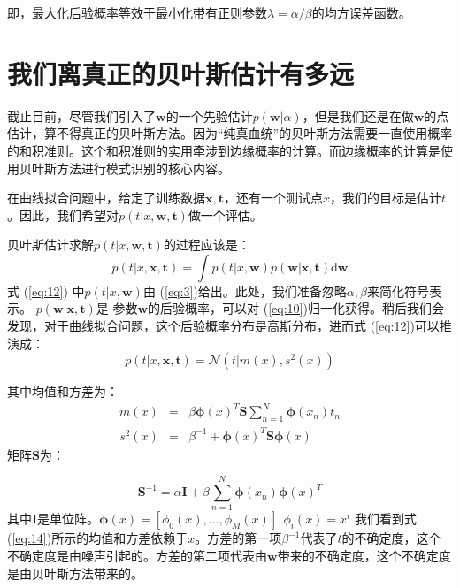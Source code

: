 \documentclass[10pt,a4paper,UTF8]{article}
\begin{document}
即，最大化后验概率等效于最小化带有正则参数\(\lambda = \alpha/\beta\)的均方误差函数。

\section{我们离真正的贝叶斯估计有多远}
\label{sec:org4e00da5}


截止目前，尽管我们引入了\(\mathbf{w}\)的一个先验估计\(p(\mathbf{w}|\alpha)\)，但是我们还是在做\(\mathbf{w}\)的点估计，算不得真正的贝叶斯方法。因为“纯真血统”的贝叶斯方法需要一直使用概率的和积准则。这个和积准则的实用牵涉到边缘概率的计算。而边缘概率的计算是使用贝叶斯方法进行模式识别的核心内容。

在曲线拟合问题中，给定了训练数据\(\mathbf{x}, \mathbf{t}\)，还有一个测试点\(x\)，我们的目标是估计\(t\)。因此，我们希望对\(p(t|x, \mathbf{w}, \mathbf{t})\)做一个评估。

贝叶斯估计求解\(p(t|x, \mathbf{w}, \mathbf{t})\)的过程应该是：
\begin{equation}
\label{eq:12}
p(t| x, \mathbf{x}, \mathbf{t}) = \int p(t | x, \mathbf{w})p( \mathbf{w} | \mathbf{x}, \mathbf{t}) \mathrm{d} \mathbf{w}
\end{equation}
式 (\ref{eq:12}) 中\(p(t| x, \mathbf{w})\)由 (\ref{eq:3})给出。此处，我们准备忽略\(\alpha, \beta\)来简化符号表示。 \(p( \mathbf{w} | \mathbf{x}, \mathbf{t})\)是 参数\(\mathbf{w}\)的后验概率，可以对 (\ref{eq:10})归一化获得。稍后我们会发现，对于曲线拟合问题，这个后验概率分布是高斯分布，进而式 (\ref{eq:12})可以推演成：
\begin{equation}
\label{eq:13}
p(t| x, \mathbf{x}, \mathbf{t}) = \mathcal{N}(t| m(x), s^{2}(x))
\end{equation}

其中均值和方差为：
\begin{eqnarray}
\label{eq:14}
m(x) &=& \beta \mathbf{\phi}(x)^{T} \mathbf{S} \sum_{n=1}^{N}\mathbf{\phi}(x_{n})t_{n} \\
s^{2}(x) &=& \beta^{-1} + \mathbf{\phi}(x)^{T} \mathbf{S} \mathbf{\phi}(x)
\end{eqnarray}
矩阵\(\mathbf{S}\)为：

\begin{equation}
\label{eq:15}
\mathbf{S}^{-1} = \alpha \mathbf{I} + \beta\sum_{n=1}^{N} \mathbf{\phi}(x_{n}) \mathbf{\phi}(x)^{T}
\end{equation}
其中\(\mathbf{I}\)是单位阵。\(\mathbf{\phi}(x) = [\phi_{0}(x), \ldots ,\phi_{M}(x)], \phi_{i}(x) = x^{i}\)
我们看到式 (\ref{eq:14})所示的均值和方差依赖于\(x\)。方差的第一项\(\beta^{-1}\)代表了\(t\)的不确定度，这个不确定度是由噪声引起的。方差的第二项代表由\(\mathbf{w}\)带来的不确定度，这个不确定度是由贝叶斯方法带来的。
\end{document}
